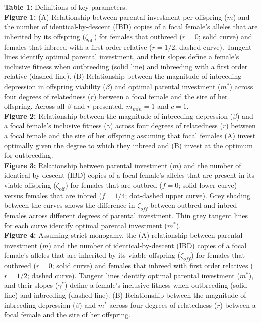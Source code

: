\documentclass[12pt]{article}
\begin{document}



\clearpage

\noindent \textbf{Table 1:}  Definitions of key parameters. \\

\noindent \textbf{Figure 1:} (A) Relationship between parental investment per offspring ($m$) and the number of identical-by-descent (IBD) copies of a focal female's alleles that are inherited by its offspring ($\zeta_{\textrm{off}}$) for females that outbreed ($r=0$; solid curve) and females that inbreed with a first order relative ($r=1/2$; dashed curve). Tangent lines identify optimal parental investment, and their slopes define a female's inclusive fitness when outbreeding (solid line) and inbreeding with a first order relative (dashed line). (B) Relationship between the magnitude of inbreeding depression in offspring viability ($\beta$) and optimal parental investment ($m^{*}$) across four degrees of relatedness ($r$) between a focal female and the sire of her offspring. Across all $\beta$ and $r$ presented, $m_{min}=1$ and $c=1$. \\

\noindent \textbf{Figure 2:} Relationship between the magnitude of inbreeding depression ($\beta$) and a focal female's inclusive fitness ($\gamma$) across four degrees of relatedness ($r$) between a focal female and the sire of her offspring assuming that focal females (A) invest optimally given the degree to which they inbreed and (B) invest at the optimum for outbreeding. \\

\noindent \textbf{Figure 3:} Relationship between parental investment ($m$) and the number of identical-by-descent (IBD) copies of a focal female's alleles that are present in its viable offspring ($\zeta_{\textrm{off}}$) for females that are outbred ($f=0$; solid lower curve) versus females that are inbred ($f=1/4$; dot-dashed upper curve). Grey shading between the curves shows the difference in $\zeta_{off}$ between outbred and inbred females across different degrees of parental investment. Thin grey tangent lines for each curve identify optimal parental investment ($m^{*}$). \\

\noindent \textbf{Figure 4:} Assuming strict monogamy, the (A) relationship between parental investment ($m$) and the number of identical-by-descent (IBD) copies of a focal female's alleles that are inherited by its viable offspring ($\zeta_{off}$) for females that outbreed ($r=0$; solid curve) and females that inbreed with first order relatives ($r=1/2$; dashed curve). Tangent lines identify optimal parental investment ($m^{*}$), and their slopes ($\gamma^{*}$) define a female's inclusive fitness when outbreeding (solid line) and inbreeding (dashed line). (B) Relationship between the magnitude of inbreeding depression ($\beta$) and $m^{*}$ across four degrees of relatedness ($r$) between a focal female and the sire of her offspring. \\
\end{document}

